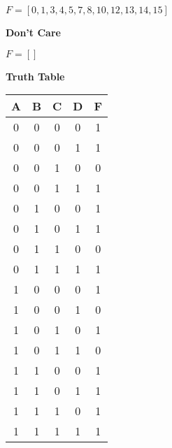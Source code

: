 $F = [0, 1, 3, 4, 5, 7, 8, 10, 12, 13, 14, 15]$

\textbf{Don't Care }

$F = []$



\textbf{Truth Table }



\begin{tabular}{|c|c|c|c||c|}
\hline
A & B & C & D & F \\

    
        \hline
    
  
  
  0 & 0 & 0 & 0 & 1 \\

    
  
  
  0 & 0 & 0 & 1 & 1 \\

    
  
  
  0 & 0 & 1 & 0 & 0 \\

    
  
  
  0 & 0 & 1 & 1 & 1 \\

    
        \hline
    
  
  
  0 & 1 & 0 & 0 & 1 \\

    
  
  
  0 & 1 & 0 & 1 & 1 \\

    
  
  
  0 & 1 & 1 & 0 & 0 \\

    
  
  
  0 & 1 & 1 & 1 & 1 \\

    
        \hline
    
  
  
  1 & 0 & 0 & 0 & 1 \\

    
  
  
  1 & 0 & 0 & 1 & 0 \\

    
  
  
  1 & 0 & 1 & 0 & 1 \\

    
  
  
  1 & 0 & 1 & 1 & 0 \\

    
        \hline
    
  
  
  1 & 1 & 0 & 0 & 1 \\

    
  
  
  1 & 1 & 0 & 1 & 1 \\

    
  
  
  1 & 1 & 1 & 0 & 1 \\

    
  
  
  1 & 1 & 1 & 1 & 1 \\

\hline
\end{tabular}



